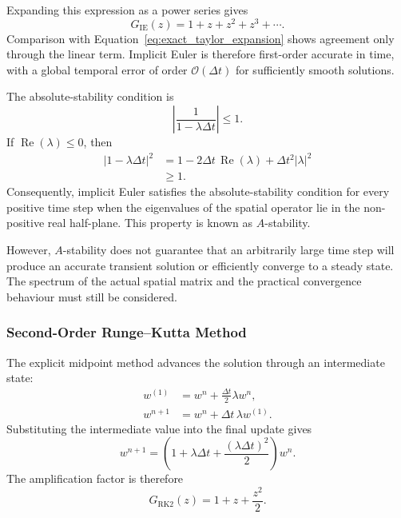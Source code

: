 Expanding this expression as a power series gives
\begin{equation}
G_{\mathrm{IE}}(z)
=
1+z+z^2+z^3+\cdots.
\end{equation}
Comparison with Equation~\eqref{eq:exact_taylor_expansion}
shows agreement only through the linear term. Implicit
Euler is therefore first-order accurate in time, with a
global temporal error of order $\mathcal{O}(\Delta t)$
for sufficiently smooth solutions.

The absolute-stability condition is
\begin{equation}
\left|
\frac{1}{1-\lambda\Delta t}
\right|
\leq 1.
\label{eq:implicit_euler_stability}
\end{equation}
If $\operatorname{Re}(\lambda)\leq 0$, then
\begin{equation}
\begin{aligned}
|1-\lambda\Delta t|^2
&=
1-2\Delta t\,\operatorname{Re}(\lambda)
+\Delta t^2|\lambda|^2
\\
&\geq 1.
\end{aligned}
\end{equation}
Consequently, implicit Euler satisfies the absolute-stability
condition for every positive time step when the eigenvalues
of the spatial operator lie in the non-positive real
half-plane. This property is known as $A$-stability.

However, $A$-stability does not guarantee that an arbitrarily
large time step will produce an accurate transient solution
or efficiently converge to a steady state. The spectrum of
the actual spatial matrix and the practical convergence
behaviour must still be considered.

\subsubsection{Second-Order Runge--Kutta Method}

The explicit midpoint method advances the solution through
an intermediate state:
\begin{align}
w^{(1)}
&=
w^n+\frac{\Delta t}{2}\lambda w^n,
\\
w^{n+1}
&=
w^n+\Delta t\,\lambda w^{(1)}.
\end{align}
Substituting the intermediate value into the final update
gives
\begin{equation}
w^{n+1}
=
\left(
1+\lambda\Delta t
+\frac{(\lambda\Delta t)^2}{2}
\right)w^n.
\end{equation}
The amplification factor is therefore
\begin{equation}
\boxed{
G_{\mathrm{RK2}}(z)
=
1+z+\frac{z^2}{2}.
}
\label{eq:rk2_amplification}
\end{equation}

